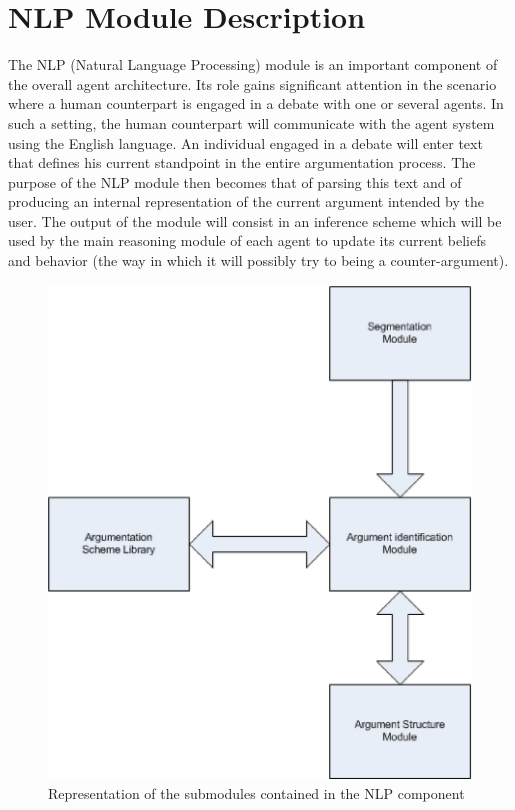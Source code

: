 \section{NLP Module Description}

The NLP (Natural Language Processing) module is an important component of the overall agent architecture. Its role gains significant attention in the scenario where a human counterpart is engaged in a debate with one or several agents.
In such a setting, the human counterpart will communicate with the agent system using the English language. An individual engaged in a debate will enter text that defines his current standpoint in the entire argumentation process.
The purpose of the NLP module then becomes that of parsing this text and of producing an internal representation of the current argument intended by the user. The output of the module will consist in an inference scheme which will be used by
the main reasoning module of each agent to update its current beliefs and behavior (the way in which it will possibly try to being a counter-argument).

\begin{figure}
\includegraphics[scale=0.5]{images/NLP_Architecture.eps}
\caption{Representation of the submodules contained in the NLP component}
\label{fig:NLPArchitecture}
\end{figure}

